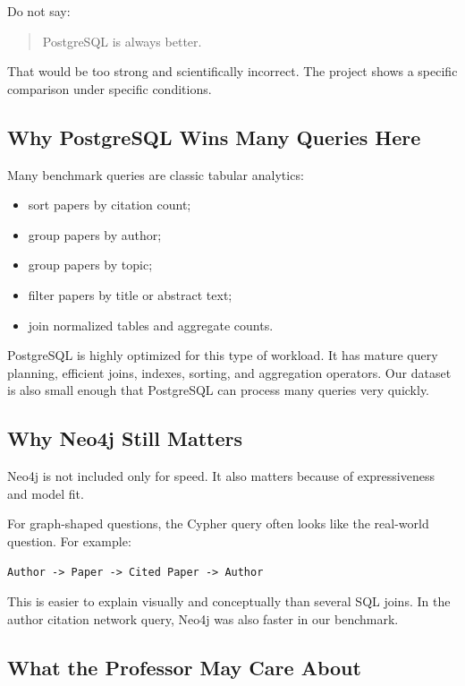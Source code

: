 \documentclass[11pt]{article}
\begin{document}
Do not say:

\begin{quote}
PostgreSQL is always better.
\end{quote}

That would be too strong and scientifically incorrect.
The project shows a specific comparison under specific conditions.

\subsection{Why PostgreSQL Wins Many Queries Here}

Many benchmark queries are classic tabular analytics:

\begin{itemize}
    \item sort papers by citation count;
    \item group papers by author;
    \item group papers by topic;
    \item filter papers by title or abstract text;
    \item join normalized tables and aggregate counts.
\end{itemize}

PostgreSQL is highly optimized for this type of workload.
It has mature query planning, efficient joins, indexes, sorting, and aggregation operators.
Our dataset is also small enough that PostgreSQL can process many queries very quickly.

\subsection{Why Neo4j Still Matters}

Neo4j is not included only for speed.
It also matters because of expressiveness and model fit.

For graph-shaped questions, the Cypher query often looks like the real-world question.
For example:

\begin{verbatim}
Author -> Paper -> Cited Paper -> Author
\end{verbatim}

This is easier to explain visually and conceptually than several SQL joins.
In the author citation network query, Neo4j was also faster in our benchmark.

\subsection{What the Professor May Care About}
\end{document}
